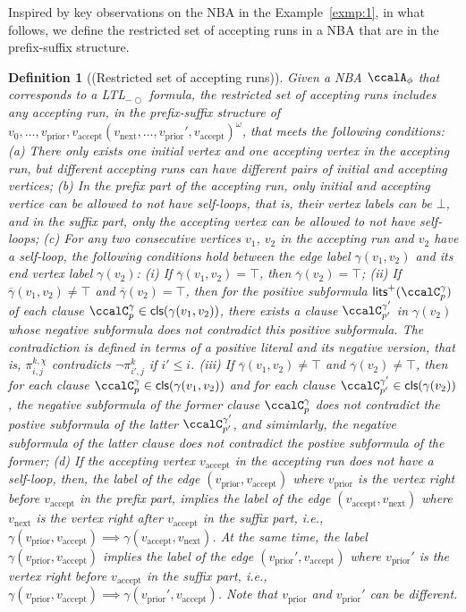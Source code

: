 \documentclass[Afour,sageh,times]{sagej}
\newtheorem{defn}[thm]{Definition}
\newcommand{\ltl}{ {\it LTL}$_{-\bigcirc}$ }
\newcommand{\autop}{\ccalA_{\phi}}
\newcommand{\vertex}[1]{v_{\text{#1}}}
\renewcommand{\ap}[3]{\mathcal{\pi}_{{#1},{#2}}^{#3}}
\begin{document}
Inspired by key observations on the NBA in the Example~\ref{exmp:1}, in what follows, we define the restricted set of accepting runs in a NBA that are in the prefix-suffix structure.
\begin{defn}[(Restricted set of accepting runs)]\label{defn:run}
   Given a NBA $\autop$ that corresponds to a \ltl formula, the  restricted set of accepting runs includes any accepting run, in the prefix-suffix structure of $v_0, \ldots, \vertex{prior}, \vertex{accept} (\vertex{next}, \ldots, \vertex{prior}', \vertex{accept})^\omega$, that meets the following conditions: (a)\label{cond:a} There only exists one initial vertex and one  accepting vertex in the accepting run, but different accepting runs can have different pairs of initial and accepting vertices; (b)\label{cond:b} In the prefix part of the accepting run, only initial and accepting vertice can be allowed to not have self-loops, that is, their vertex labels  can be $\bot$, and in the suffix part,  only the accepting vertex can be allowed to not have self-loops; (c)\label{cond:c} For any two consecutive vertices $v_1$, $v_2$ in the accepting run and $v_2$ have a self-loop, the following conditions hold between the edge label $\gamma(v_1,v_2)$ and its end vertex label $\gamma(v_2)$: {\it (i)} If $\overline{\gamma}(v_1, v_2) = \top$, then $\overline{\gamma}(v_2) = \top$; {\it (ii)} If $\overline{\gamma}(v_1, v_2) \neq \top$ and $\overline{\gamma}(v_2)= \top$, then for the positive subformula $\mathsf{lits}^+(\ccalC_p^\gamma)$ of each clause $\ccalC_p^\gamma \in \mathsf{cls}(\gamma(v_1, v_2))$, there exists a clause $\ccalC_{p'}^{\gamma'} $ in $\gamma(v_2)$ whose negative subformula does  not contradict this positive subformula. The contradiction is defined in terms of a positive literal and its negative version, that is, $\ap{i}{j}{k,\chi}$  contradicts  $\neg\ap{i'}{j}{k}$ if $i' \leq i$. {\it (iii)} If $\overline{\gamma}(v_1, v_2) \neq \top$ and $\overline{\gamma}(v_2) \neq \top$, then for each clause $\ccalC_p^\gamma \in \mathsf{cls}(\gamma(v_1, v_2))$ and for each clause $\ccalC_{p'}^{\gamma'} \in \mathsf{cls}(\gamma(v_2))$, the negative subformula of the former clause $\ccalC_p^\gamma$ does not contradict the postive subformula of the latter $\ccalC_{p'}^{\gamma'}$, and simimlarly, the negative subformula of the latter clause does not contradict the postive subformula of the former; (d)\label{cond:d}  If the accepting vertex $\vertex{accept}$ in the accepting run does not have a self-loop, then, the label of the edge $(\vertex{prior}, \vertex{accept})$ where $\vertex{prior}$ is the vertex right before $\vertex{accept}$ in the prefix part, implies the label of the edge $(\vertex{accept}, \vertex{next})$ where $\vertex{next}$ is the vertex right after $\vertex{accept}$ in the suffix part, i.e., $\gamma(\vertex{prior}, \vertex{accept}) \implies  \gamma(\vertex{accept}, \vertex{next})$. At the same time, the label $\gamma(\vertex{prior}, \vertex{accept})$ implies the label of the edge $(\vertex{prior}', \vertex{accept})$ where $\vertex{prior}'$ is the vertex right before $\vertex{accept}$ in the suffix part, i.e., $\gamma(\vertex{prior}, \vertex{accept}) \implies  \gamma(\vertex{prior}', \vertex{accept})$. Note that $\vertex{prior}$ and $\vertex{prior}'$ can be different.

\end{defn}
\end{document}
